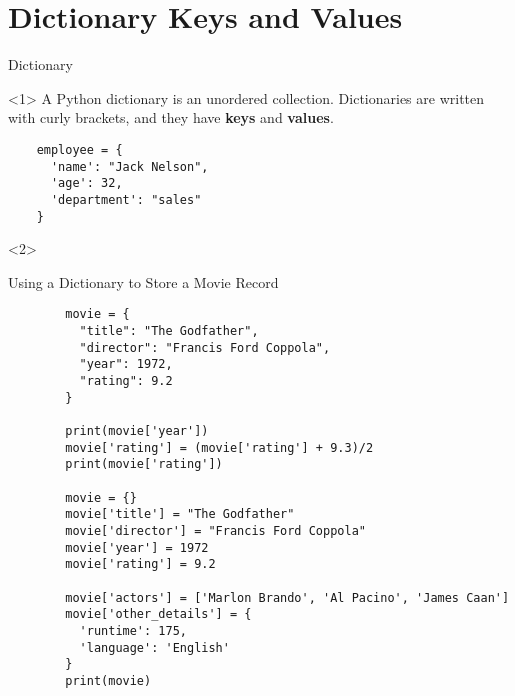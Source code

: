 \section{Dictionary Keys and Values}
\label{sec:dictiories}

\begin{frame}[fragile]{Dictionary}
  \begin{onlyenv}<1>
      A Python dictionary is an unordered collection. Dictionaries are written with curly brackets, and they have \textbf{keys} and \textbf{values}.

  \begin{lstlisting}
    employee = {
      'name': "Jack Nelson",
      'age': 32,
      'department': "sales"
    }
  \end{lstlisting}
  \end{onlyenv}

  \begin{onlyenv}<2>
    \begin{exercise}{Using a Dictionary to Store a Movie Record}
      \begin{lstlisting}
        movie = {
          "title": "The Godfather",
          "director": "Francis Ford Coppola",
          "year": 1972,
          "rating": 9.2
        }
        
        print(movie['year'])
        movie['rating'] = (movie['rating'] + 9.3)/2
        print(movie['rating'])

        movie = {}
        movie['title'] = "The Godfather"
        movie['director'] = "Francis Ford Coppola"
        movie['year'] = 1972
        movie['rating'] = 9.2

        movie['actors'] = ['Marlon Brando', 'Al Pacino', 'James Caan']
        movie['other_details'] = {
          'runtime': 175,
          'language': 'English'
        }
        print(movie)
      \end{lstlisting}
  \end{exercise}
\end{onlyenv}
\end{frame}

